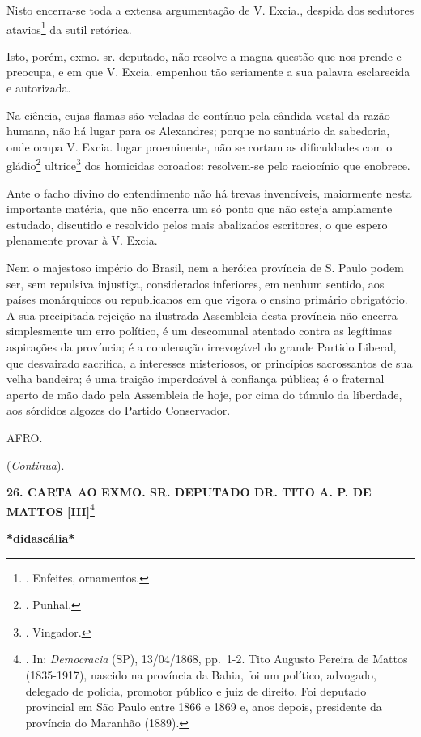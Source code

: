 Nisto encerra-se toda a extensa argumentação de V. Excia., despida dos
sedutores atavios\footnote{. Enfeites, ornamentos.} da sutil retórica.

Isto, porém, exmo. sr. deputado, não resolve a magna questão que nos
prende e preocupa, e em que V. Excia. empenhou tão seriamente a sua
palavra esclarecida e autorizada.

Na ciência, cujas flamas são veladas de contínuo pela cândida vestal da
razão humana, não há lugar para os Alexandres; porque no santuário da
sabedoria, onde ocupa V. Excia. lugar proeminente, não se cortam as
dificuldades com o gládio\footnote{. Punhal.} ultrice\footnote{.
  Vingador.} dos homicidas coroados: resolvem-se pelo raciocínio que
enobrece.

Ante o facho divino do entendimento não há trevas invencíveis,
maiormente nesta importante matéria, que não encerra um só ponto que não
esteja amplamente estudado, discutido e resolvido pelos mais abalizados
escritores, o que espero plenamente provar à V. Excia.

Nem o majestoso império do Brasil, nem a heróica província de S. Paulo
podem ser, sem repulsiva injustiça, considerados inferiores, em nenhum
sentido, aos países monárquicos ou republicanos em que vigora o ensino
primário obrigatório. A sua precipitada rejeição na ilustrada Assembleia
desta província não encerra simplesmente um erro político, é um
descomunal atentado contra as legítimas aspirações da província; é a
condenação irrevogável do grande Partido Liberal, que desvairado
sacrifica, a interesses misteriosos, or princípios sacrossantos de sua
velha bandeira; é uma traição imperdoável à confiança pública; é o
fraternal aperto de mão dado pela Assembleia de hoje, por cima do túmulo
da liberdade, aos sórdidos algozes do Partido Conservador.

AFRO.

(\emph{Continua}).

\textbf{26. CARTA AO EXMO. SR. DEPUTADO DR. TITO A. P. DE MATTOS
{[}III{]}}\footnote{. In: \emph{Democracia} (SP), 13/04/1868, pp.~1-2.
  Tito Augusto Pereira de Mattos (1835-1917), nascido na província da
  Bahia, foi um político, advogado, delegado de polícia, promotor
  público e juiz de direito. Foi deputado provincial em São Paulo entre
  1866 e 1869 e, anos depois, presidente da província do Maranhão
  (1889).}

\textbf{*didascália*}

